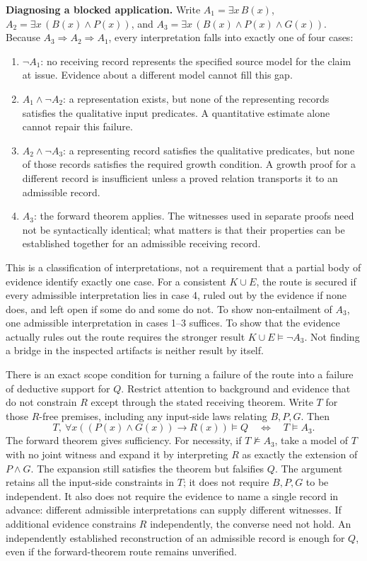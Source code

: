 \documentclass[pdflatex,sn-apa]{sn-jnl}
\begin{document}
\noindent\textbf{Diagnosing a blocked application.}
Write \(A_1=\exists x\, B(x)\), \(A_2=\exists x\,(B(x)\land P(x))\), and \(A_3=\exists x\,(B(x)\land P(x)\land G(x))\). Because \(A_3\Rightarrow A_2\Rightarrow A_1\), every interpretation falls into exactly one of four cases:
\begin{enumerate}
\item \(\neg A_1\): no receiving record represents the specified source model for the claim at issue. Evidence about a different model cannot fill this gap.
\item \(A_1\land\neg A_2\): a representation exists, but none of the representing records satisfies the qualitative input predicates. A quantitative estimate alone cannot repair this failure.
\item \(A_2\land\neg A_3\): a representing record satisfies the qualitative predicates, but none of those records satisfies the required growth condition. A growth proof for a different record is insufficient unless a proved relation transports it to an admissible record.
\item \(A_3\): the forward theorem applies. The witnesses used in separate proofs need not be syntactically identical; what matters is that their properties can be established together for an admissible receiving record.
\end{enumerate}
This is a classification of interpretations, not a requirement that a partial body of evidence identify exactly one case. For a consistent \(K\cup E\), the route is secured if every admissible interpretation lies in case 4, ruled out by the evidence if none does, and left open if some do and some do not. To show non-entailment of \(A_3\), one admissible interpretation in cases 1--3 suffices. To show that the evidence actually rules out the route requires the stronger result \(K\cup E\models\neg A_3\). Not finding a bridge in the inspected artifacts is neither result by itself.

There is an exact scope condition for turning a failure of the route into a failure of deductive support for \(Q\). Restrict attention to background and evidence that do not constrain \(R\) except through the stated receiving theorem. Write \(T\) for those \(R\)-free premises, including any input-side laws relating \(B,P,G\). Then
\[
T,\ \forall x((P(x)\land G(x))\to R(x))\models Q
\quad\Longleftrightarrow\quad T\models A_3.
\]
The forward theorem gives sufficiency. For necessity, if \(T\not\models A_3\), take a model of \(T\) with no joint witness and expand it by interpreting \(R\) as exactly the extension of \(P\land G\). The expansion still satisfies the theorem but falsifies \(Q\). The argument retains all the input-side constraints in \(T\); it does not require \(B,P,G\) to be independent. It also does not require the evidence to name a single record in advance: different admissible interpretations can supply different witnesses. If additional evidence constrains \(R\) independently, the converse need not hold. An independently established reconstruction of an admissible record is enough for \(Q\), even if the forward-theorem route remains unverified.
\end{document}
